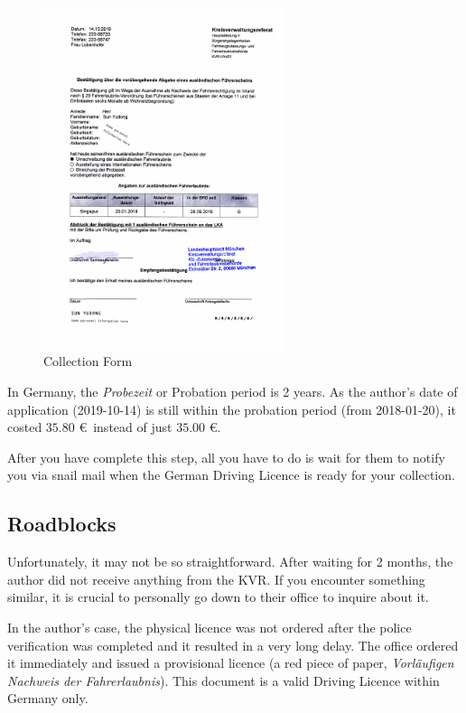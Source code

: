 \documentclass{article}
\newcommand{\de}[1]{\textcolor{NavyBlue}{\textit{#1}}}
\begin{document}
        \begin{figure}[H]
            \centering
            \includegraphics[width=0.63\textwidth]{collection.pdf}
            \caption{Collection Form}
            \label{fig:collection}
        \end{figure}
        
        In Germany, the \de{Probezeit} or Probation period is 2 years. As the author's date of application (2019-10-14) is still within the probation period (from 2018-01-20), it costed $35.80$ \euro~instead of just $35.00$ \euro.
        
        After you have complete this step, all you have to do is wait for them to notify you via snail mail when the German Driving Licence is ready for your collection.
    
    \subsection{Roadblocks} \label{subsec:roadblocks}
        Unfortunately, it may not be so straightforward. After waiting for 2 months, the author did not receive anything from the KVR. If you encounter something similar, it is crucial to personally go down to their office to inquire about it. 
        
        In the author's case, the physical licence was not ordered after the police verification was completed and it resulted in a very long delay. The office ordered it immediately and issued a provisional licence (a red piece of paper, \de{Vorläufigen Nachweis der Fahrerlaubnis}). This document is a valid Driving Licence within Germany only. 
\end{document}
